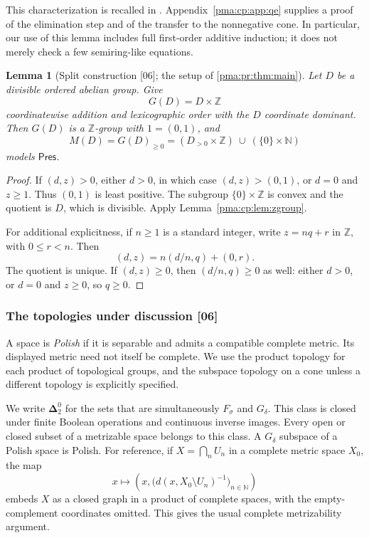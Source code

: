 \documentclass[11pt]{article}
\numberwithin{equation}{section}
\newtheorem{lemma}[lemma]{Lemma}
\theoremstyle{definition}
\theoremstyle{remark}
\newcommand{\N}{\mathbb N}
\newcommand{\Z}{\mathbb Z}
\newcommand{\src}[1]{\textup{\textsf{\small[#1]}}}
\newcommand{\Pres}{\mathsf{Pres}}
\begin{document}
This characterization is recalled in \cite[Section~2]{jerabek}.
Appendix~\ref{pma:cp:app:qe} supplies a proof of the elimination step and of the
transfer to the nonnegative cone. In particular, our use of this lemma
includes full first-order additive induction; it does not merely check
a few semiring-like equations.

\begin{lemma}[Split construction \src{06}; the setup of \cref{pma:pr:thm:main}]
\label{pma:cp:lem:split}
Let $D$ be a divisible ordered abelian group. Give
\[
 G(D)=D\times\Z
\]
coordinatewise addition and lexicographic order with the $D$ coordinate
dominant. Then $G(D)$ is a $\Z$-group with $1=(0,1)$, and
\begin{equation}
 M(D)=G(D)_{\geq0}
 =(D_{>0}\times\Z)\ \cup\ (\{0\}\times\N)
 \label{pma:cp:eq:cone}
\end{equation}
models $\Pres$.
\end{lemma}

\begin{proof}
If $(d,z)>0$, either $d>0$, in which case $(d,z)>(0,1)$, or $d=0$ and
$z\geq1$. Thus $(0,1)$ is least positive. The subgroup
$\{0\}\times\Z$ is convex and the quotient is $D$, which is divisible.
Apply Lemma~\ref{pma:cp:lem:zgroup}.

For additional explicitness, if $n\geq1$ is a standard integer, write
$z=nq+r$ in $\Z$, with $0\leq r<n$. Then
\begin{equation}
 (d,z)=n(d/n,q)+(0,r).
 \label{pma:cp:eq:division}
\end{equation}
The quotient is unique. If $(d,z)\geq0$, then $(d/n,q)\geq0$ as well:
either $d>0$, or $d=0$ and $z\geq0$, so $q\geq0$.
\end{proof}

\subsubsection{The topologies under discussion \src{06}}

A space is \emph{Polish} if it is separable and admits a compatible
complete metric. Its displayed metric need not itself be complete.
We use the product topology for each product of topological groups,
and the subspace topology on a cone unless a different topology is
explicitly specified.

We write $\boldsymbol\Delta^0_2$ for the sets that are simultaneously
$F_\sigma$ and $G_\delta$. This class is closed under finite Boolean
operations and continuous inverse images. Every open or closed subset
of a metrizable space belongs to this class. A $G_\delta$ subspace of a
Polish space is Polish. For reference, if $X=\bigcap_n U_n$ in a complete
metric space $X_0$, the map
\[
 x\longmapsto\left(x,
       \bigl(d(x,X_0\setminus U_n)^{-1}\bigr)_{n\in\N}\right)
\]
embeds $X$ as a closed graph in a product of complete spaces, with the
empty-complement coordinates omitted. This gives the usual complete
metrizability argument.
\end{document}
